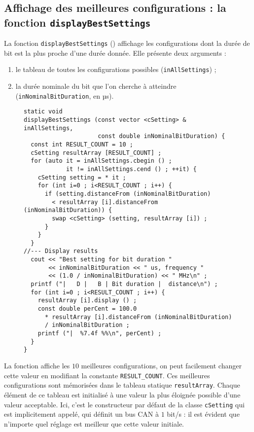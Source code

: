  

\subsection{Affichage des meilleures configurations : la fonction \texttt{displayBestSettings}}

La fonction \texttt{displayBestSettings} () affichage les configurations dont la durée de bit est la plus proche d'une durée donnée. Elle présente deux arguments : 
\begin{enumerate}
  \item le tableau de toutes les configurations possibles (\texttt{inAllSettings}) ;
  \item la durée nominale du bit que l'on cherche à atteindre (\texttt{inNominalBitDuration}, en µs).
\end{enumerate}



\begin{figure}[!ht]
\begin{lstlisting}
static void
displayBestSettings (const vector <cSetting> & inAllSettings,
                     const double inNominalBitDuration) {
  const int RESULT_COUNT = 10 ;
  cSetting resultArray [RESULT_COUNT] ;
  for (auto it = inAllSettings.cbegin () ;
            it != inAllSettings.cend () ; ++it) {
    cSetting setting = * it ;
    for (int i=0 ; i<RESULT_COUNT ; i++) {
      if (setting.distanceFrom (inNominalBitDuration)
        < resultArray [i].distanceFrom (inNominalBitDuration)) {
        swap <cSetting> (setting, resultArray [i]) ;
      }
    }
  }
//--- Display results
  cout << "Best setting for bit duration "
       << inNominalBitDuration << " us, frequency "
       << (1.0 / inNominalBitDuration) << " MHz\n" ;
  printf ("|   D |   B | Bit duration |  distance\n") ;
  for (int i=0 ; i<RESULT_COUNT ; i++) {
    resultArray [i].display () ;
    const double perCent = 100.0
      * resultArray [i].distanceFrom (inNominalBitDuration)
      / inNominalBitDuration ;
    printf ("|  %7.4f %%\n", perCent) ;
  }
}
\end{lstlisting}
\end{figure}


La fonction affiche les $10$ meilleures configurations, on peut facilement changer cette valeur en modifiant la constante \texttt{RESULT\_COUNT}. Ces meilleures configurations sont mémorisées dans le tableau statique \texttt{resultArray}. Chaque élément de ce tableau est initialisé à une valeur la plus éloignée possible d'une valeur acceptable. Ici, c'est le constructeur par défaut de la classe \texttt{cSetting} qui est implicitement appelé, qui définit un bus CAN à $1$ bit/s : il est évident que n'importe quel réglage est meilleur que cette valeur initiale.

